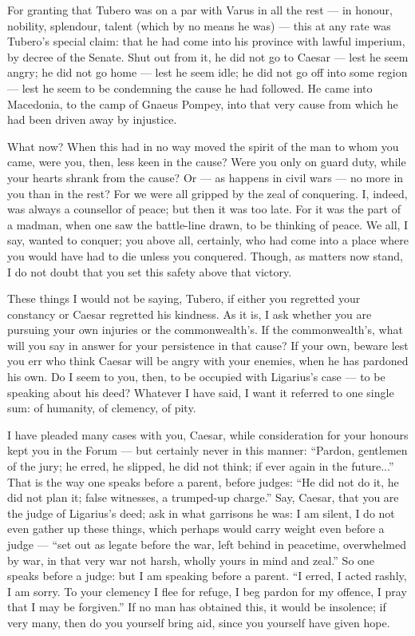  For granting that Tubero was on a par with Varus in all the rest --- in honour, nobility, splendour, talent (which by no means he was) --- this at any rate was Tubero's special claim: that he had come into his province with lawful imperium, by decree of the Senate. Shut out from it, he did not go to Caesar --- lest he seem angry; he did not go home --- lest he seem idle; he did not go off into some region --- lest he seem to be condemning the cause he had followed. He came into Macedonia, to the camp of Gnaeus Pompey, into that very cause from which he had been driven away by injustice.

 What now? When this had in no way moved the spirit of the man to whom you came, were you, then, less keen in the cause? Were you only on guard duty, while your hearts shrank from the cause? Or --- as happens in civil wars --- no more in you than in the rest? For we were all gripped by the zeal of conquering. I, indeed, was always a counsellor of peace; but then it was too late. For it was the part of a madman, when one saw the battle-line drawn, to be thinking of peace. We all, I say, wanted to conquer; you above all, certainly, who had come into a place where you would have had to die unless you conquered. Though, as matters now stand, I do not doubt that you set this safety above that victory.

 These things I would not be saying, Tubero, if either you regretted your constancy or Caesar regretted his kindness. As it is, I ask whether you are pursuing your own injuries or the commonwealth's. If the commonwealth's, what will you say in answer for your persistence in that cause? If your own, beware lest you err who think Caesar will be angry with your enemies, when he has pardoned his own. Do I seem to you, then, to be occupied with Ligarius's case --- to be speaking about his deed? Whatever I have said, I want it referred to one single sum: of humanity, of clemency, of pity.

 I have pleaded many cases with you, Caesar, while consideration for your honours kept you in the Forum --- but certainly never in this manner: ``Pardon, gentlemen of the jury; he erred, he slipped, he did not think; if ever again in the future...'' That is the way one speaks before a parent, before judges: ``He did not do it, he did not plan it; false witnesses, a trumped-up charge.'' Say, Caesar, that you are the judge of Ligarius's deed; ask in what garrisons he was: I am silent, I do not even gather up these things, which perhaps would carry weight even before a judge --- ``set out as legate before the war, left behind in peacetime, overwhelmed by war, in that very war not harsh, wholly yours in mind and zeal.'' So one speaks before a judge: but I am speaking before a parent. ``I erred, I acted rashly, I am sorry. To your clemency I flee for refuge, I beg pardon for my offence, I pray that I may be forgiven.'' If no man has obtained this, it would be insolence; if very many, then do you yourself bring aid, since you yourself have given hope.

